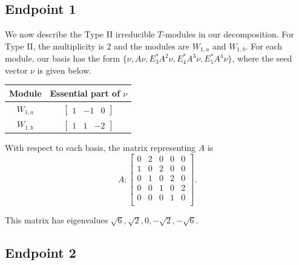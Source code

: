 \documentclass[12pt,letterpaper]{article}
\newcommand{\rowvector}[1]{\begin{bmatrix} #1 \end{bmatrix}}
\begin{document}
\subsection{Endpoint 1}

We now describe the Type II irreducible $T$-modules in our decomposition. For Type II, the multiplicity is 2 and the modules are $W_{1,a}$ and $W_{1,b}$. For each module, our basis has the form $\{\nu, A\nu, E_3^*A^2\nu, E_4^*A^3\nu,  E_5^*A^4\nu\}$, where the seed vector $\nu$ is given below.
\begin{center}
    \begin{tabular}{c | c}
    \toprule
       \textbf{Module}  & \textbf {Essential part of }$\nu$ \\
       \midrule
       $W_{1,a}$  & $\rowvector{1 & -1 & 0}$ \\[1.67pt]
       $W_{1,b}$  & $\rowvector{1 & 1 & -2}$ \\
    \bottomrule
    \end{tabular}
\end{center}

With respect to each basis, the matrix representing $A$ is 
\begin{equation}
    A: \begin{bmatrix}
 0 & 2 & 0 & 0 & 0 \\
 1 & 0 & 2 & 0 & 0 \\
 0 & 1 & 0 & 2 & 0 \\
 0 & 0 & 1 & 0 & 2 \\
 0 & 0 & 0 & 1 & 0 \\
\end{bmatrix}.
\label{eq:t12-II}
\end{equation}

This matrix has eigenvalues $\sqrt{6}, \sqrt{2}, 0, -\sqrt{2}, -\sqrt{6}$.

\subsection{Endpoint 2}
\end{document}

